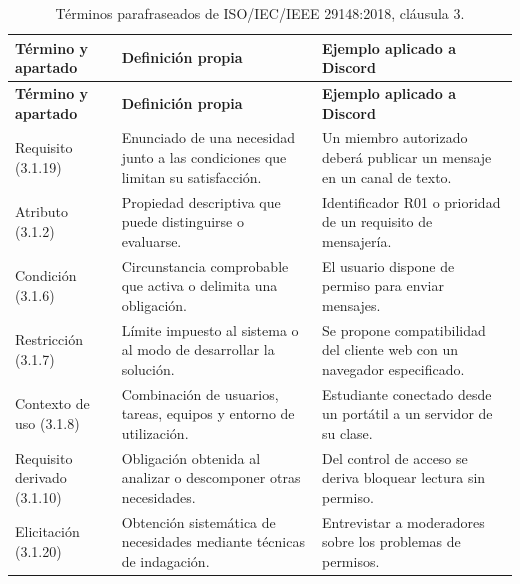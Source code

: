 \documentclass[12pt,a4paper]{article}
\begin{document}
\begingroup
\footnotesize
\renewcommand{\arraystretch}{1.10}

\begin{longtable}{
    |p{2.7cm}
    |p{5.5cm}
    |p{6.1cm}|
}

\caption{
Términos parafraseados de ISO/IEC/IEEE 29148:2018,
cláusula 3.
}
\label{tab:glosario}\\

\hline

\textbf{Término y apartado} &
\textbf{Definición propia} &
\textbf{Ejemplo aplicado a Discord}\\

\hline
\endfirsthead

\hline
\textbf{Término y apartado} &
\textbf{Definición propia} &
\textbf{Ejemplo aplicado a Discord}\\
\hline
\endhead

Requisito (3.1.19) &
Enunciado de una necesidad junto a las condiciones que limitan su satisfacción. &
Un miembro autorizado deberá publicar un mensaje en un canal de texto.\\
\hline

Atributo (3.1.2) &
Propiedad descriptiva que puede distinguirse o evaluarse. &
Identificador R01 o prioridad de un requisito de mensajería.\\
\hline

Condición (3.1.6) &
Circunstancia comprobable que activa o delimita una obligación. &
El usuario dispone de permiso para enviar mensajes.\\
\hline

Restricción (3.1.7) &
Límite impuesto al sistema o al modo de desarrollar la solución. &
Se propone compatibilidad del cliente web con un navegador especificado.\\
\hline

Contexto de uso (3.1.8) &
Combinación de usuarios, tareas, equipos y entorno de utilización. &
Estudiante conectado desde un portátil a un servidor de su clase.\\
\hline

Requisito derivado (3.1.10) &
Obligación obtenida al analizar o descomponer otras necesidades. &
Del control de acceso se deriva bloquear lectura sin permiso.\\
\hline

Elicitación (3.1.20) &
Obtención sistemática de necesidades mediante técnicas de indagación. &
Entrevistar a moderadores sobre los problemas de permisos.\\
\hline


\end{longtable}
\end{document}
